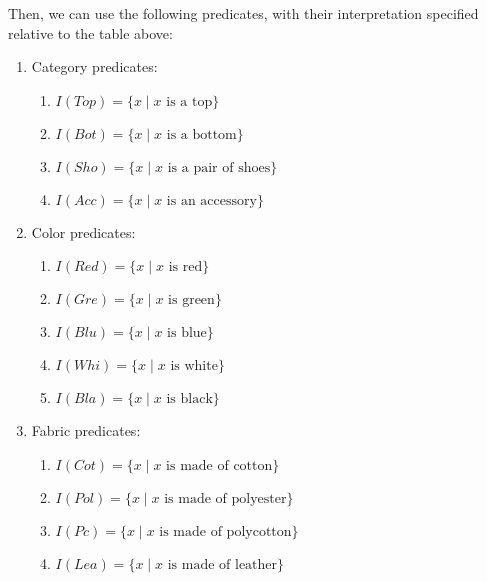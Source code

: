 Then, we can use the following predicates, with their interpretation specified relative to the table above:

\begin{enumerate}
	\item Category predicates:
	\begin{enumerate}
	\item $I(Top)=\{x \mid x\text{ is a top}\}$
	\item $I(Bot)=\{x \mid x\text{ is a bottom}\}$
	\item $I(Sho)=\{x \mid x\text{ is a pair of shoes}\}$
	\item $I(Acc)=\{x \mid x\text{ is an accessory}\}$
	\end{enumerate}
	\item Color predicates:
	\begin{enumerate}
	\item $I(Red)=\{x \mid x\text{ is red}\}$
	\item $I(Gre)=\{x \mid x\text{ is green}\}$
	\item $I(Blu)=\{x \mid x\text{ is blue}\}$
	\item $I(Whi)=\{x \mid x\text{ is white}\}$
	\item $I(Bla)=\{x \mid x\text{ is black}\}$
	\end{enumerate}
	\item Fabric predicates:
	\begin{enumerate}
	\item $I(Cot)=\{x \mid x\text{ is made of cotton}\}$
	\item $I(Pol)=\{x \mid x\text{ is made of polyester}\}$
	\item $I(Pc)=\{x \mid x\text{ is made of polycotton}\}$
	\item $I(Lea)=\{x \mid x\text{ is made of leather}\}$
	\end{enumerate}
\end{enumerate}



